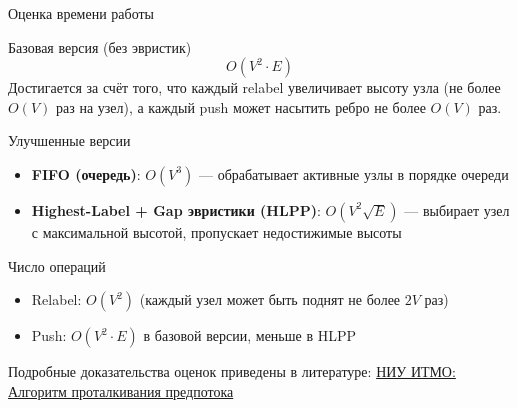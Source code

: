 \documentclass[14pt, aspectratio=169]{beamer}
\begin{document}
\begin{frame}{Оценка времени работы}
\scriptsize

\begin{block}{Базовая версия (без эвристик)}
\[
O(V^2 \cdot E)
\]
Достигается за счёт того, что каждый relabel увеличивает высоту узла (не более $O(V)$ раз на узел), а каждый push может насытить ребро не более $O(V)$ раз.
\end{block}

\begin{block}{Улучшенные версии}
\begin{itemize}
\item \textbf{FIFO (очередь)}: $O(V^3)$ — обрабатывает активные узлы в порядке очереди
\item \textbf{Highest-Label + Gap эвристики (HLPP)}: $O(V^2 \sqrt{E})$ — выбирает узел с максимальной высотой, пропускает недостижимые высоты
\end{itemize}
\end{block}

\begin{block}{Число операций}
\begin{itemize}
\item Relabel: $O(V^2)$ (каждый узел может быть поднят не более $2V$ раз)
\item Push: $O(V^2 \cdot E)$ в базовой версии, меньше в HLPP
\end{itemize}
\end{block}

Подробные доказательства оценок приведены в литературе: \href{https://neerc.ifmo.ru/wiki/index.php?title=Метод_проталкивания_предпотока}{НИУ ИТМО: Алгоритм проталкивания предпотока}


\end{frame}
\end{document}
